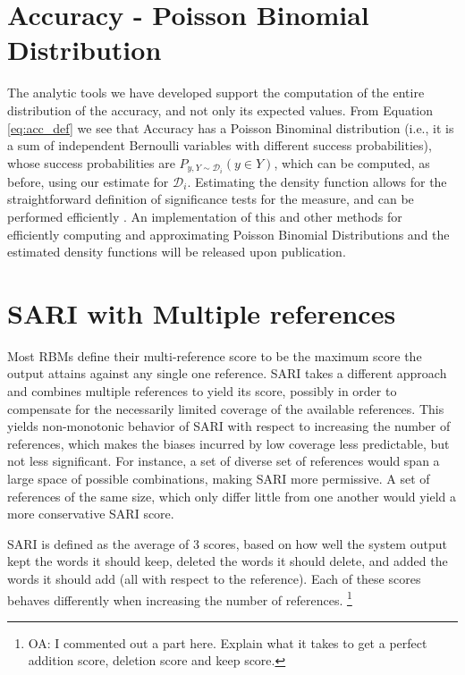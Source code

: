 \documentclass[letterpaper, 11pt]{article}
\newcommand{\oa}[1]{\footnote{\color{red}OA: #1}}
\begin{document}
\section{Accuracy - Poisson Binomial Distribution}\label{ap:poibin}
The analytic tools we have developed support the computation of the entire distribution of the accuracy, and not only its expected values. From Equation \ref{eq:acc_def} we see that Accuracy has a Poisson Binominal distribution (i.e., it is a sum of independent Bernoulli variables with different success probabilities), whose success probabilities are $P_{y,Y \sim \mathcal{D}_i}(y \in Y)$, which can be computed, as before, using our estimate for $\mathcal{D}_i$. Estimating the density function allows for the straightforward definition of significance tests for the measure, and can be performed efficiently \cite{hong2013computing}. An implementation of this and other methods for efficiently computing and approximating Poisson Binomial Distributions and the estimated density functions will be released upon publication.

\section{SARI with Multiple references}\label{ap:sari-assum}
Most RBMs define their multi-reference score to be the maximum score the
output attains against any single one reference.
SARI takes a different approach and combines multiple references to yield its score, 
possibly in order to compensate for the necessarily limited coverage of the available
references. This yields non-monotonic behavior of SARI with respect to increasing
the number of references, which makes the biases incurred by low coverage less predictable,
but not less significant.
For instance, a set of diverse set of references would span a large space of possible
combinations, making SARI more permissive. A set of references of the same size, which only differ little
from one another would yield a more conservative SARI score.

SARI is defined as the average of 3 scores, based on how well the system output kept the words it should keep,
deleted the words it should delete, and added the words it should add (all with respect to the reference).
Each of these scores behaves differently when increasing the number of references.
\oa{I commented out a part here. Explain what it takes to get a perfect addition score,
deletion score and keep score.}
\end{document}
